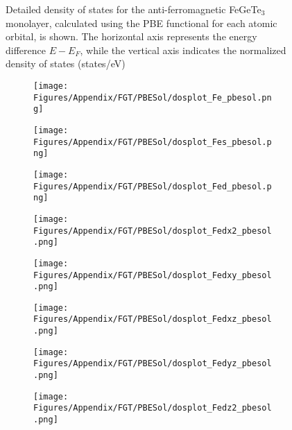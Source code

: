 \begin{figure}[H]
\caption{Detailed density of states for the anti-ferromagnetic FeGeTe$_3$ monolayer, calculated using the PBE functional for each atomic orbital, is shown. The horizontal axis represents the energy difference $E - E_F$, while the vertical axis indicates the normalized density of states (states/eV)}
\label{Fepbe}
\end{figure}
\newpage
\begin{figure}[H]
      \centering
    \begin{subfigure}{0.24\textwidth}
    \texttt{[image: Figures/Appendix/FGT/PBESol/dosplot\_Fe\_pbesol.png]}
    \label{dosplot_Fe_pbesol}   
    \end{subfigure}  
    \hfill
\begin{subfigure}{0.24\textwidth}
\centering
    \texttt{[image: Figures/Appendix/FGT/PBESol/dosplot\_Fes\_pbesol.png]}
    \label{dosplot_Fes_pbesol}
\end{subfigure}
\hfill
\begin{subfigure}{0.24\textwidth}
    \texttt{[image: Figures/Appendix/FGT/PBESol/dosplot\_Fed\_pbesol.png]}
    \label{dosplot_Fed_pbesol}
\end{subfigure}
\hfill
\begin{subfigure}{0.24\textwidth}
    \texttt{[image: Figures/Appendix/FGT/PBESol/dosplot\_Fedx2\_pbesol.png]}
    \label{dodosplot_Fedx2_pbesol}
\end{subfigure}
\hfill
\begin{subfigure}{0.24\textwidth}
    \texttt{[image: Figures/Appendix/FGT/PBESol/dosplot\_Fedxy\_pbesol.png]}
    \label{dosplot_Fedxy_pbesol}
\end{subfigure}
\hfill
\begin{subfigure}{0.24\textwidth}
    \texttt{[image: Figures/Appendix/FGT/PBESol/dosplot\_Fedxz\_pbesol.png]}
    \label{dosplot_Fedxz_pbesol}
\end{subfigure}
\hfill
\begin{subfigure}{0.24\textwidth}
    \texttt{[image: Figures/Appendix/FGT/PBESol/dosplot\_Fedyz\_pbesol.png]}
    \label{dosplot_Fedyz_pbesol}
\end{subfigure}
\hfill
\begin{subfigure}{0.24\textwidth}
    \texttt{[image: Figures/Appendix/FGT/PBESol/dosplot\_Fedz2\_pbesol.png]}
    \label{dosplot_Fedz2_pbesol}

\end{subfigure}
\end{figure}
